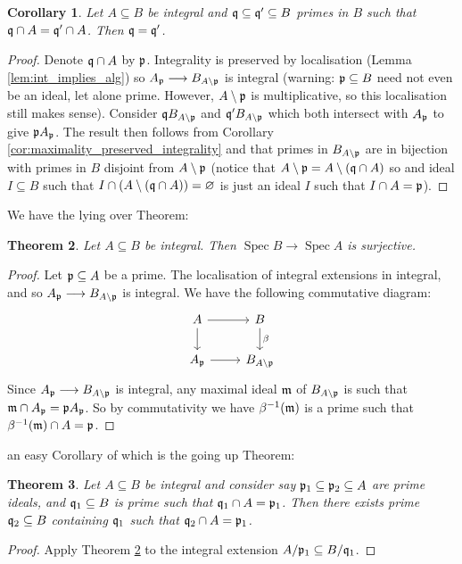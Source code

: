 \documentclass[12pt]{article}
\theoremstyle{plain}
\newtheorem{thm}{Theorem}[subsection] %
\newtheorem{cor}[thm]{Corollary}
\theoremstyle{definition}
\newcommand{\lto}{\longrightarrow}
\begin{document}
\begin{cor}
Let $A \subseteq B$ be integral and $\frak{q}\subseteq \frak{q}' \subseteq B$ primes in $B$ such that $\frak{q} \cap A = \frak{q}' \cap A$. Then $\frak{q} = \frak{q}'$.
\end{cor}
\begin{proof}
Denote $\frak{q} \cap A$ by $\frak{p}$. Integrality is preserved by localisation (Lemma \ref{lem:int_implies_alg}) so $A_\frak{p} \lto B_{A\setminus\frak{p}}$ is integral (warning: $\frak{p} \subseteq B$ need not even be an ideal, let alone prime. However, $A\setminus \frak{p}$ is multiplicative, so this localisation still makes sense). Consider $\frak{q}B_{A\setminus\frak{p}}$ and $\frak{q}'B_{A\setminus\frak{p}}$ which both intersect with $A_\frak{p}$ to give $\frak{p}A_\frak{p}$. The result then follows from Corollary \ref{cor:maximality_preserved_integrality} and that primes in $B_{A\setminus\frak{p}}$ are in bijection with primes in $B$ disjoint from ${A\setminus\frak{p}}$ (notice that $A\setminus \frak{p} = A\setminus (\frak{q} \cap A)$ so and ideal $I \subseteq B$ such that $I \cap (A\setminus(\frak{q} \cap A)) = \varnothing$ is just an ideal $I$ such that $I \cap A = \frak{p}$).
\end{proof}
We have the lying over Theorem:
\begin{thm}
\label{thm:lying_over}
Let $A \subseteq B$ be integral. Then $\operatorname{Spec}B \lto \operatorname{Spec}A$ is surjective.
\end{thm}
\begin{proof}
Let $\frak{p} \subseteq A$ be a prime. The localisation of integral extensions in integral, and so $A_\frak{p} \lto B_{A\setminus\frak{p}}$ is integral. We have the following commutative diagram:
\[
\begin{tikzcd}
A\arrow[r]\arrow[d] & B\arrow[d,"{\beta}"]\\
A_\frak{p}\arrow[r] & B_{A\setminus\frak{p}}
\end{tikzcd}
\]
Since $A_\frak{p} \lto B_{A\setminus\frak{p}}$ is integral, any maximal ideal $\frak{m}$ of $B_{A\setminus\frak{p}}$ is such that $\frak{m} \cap A_\frak{p} = \frak{p}A_\frak{p}$. So by commutativity we have $\beta^{-1}(\frak{m})$ is a prime such that $\beta^{-1}(\frak{m}) \cap A = \frak{p}$.
\end{proof}
an easy Corollary of which is the going up Theorem:
\begin{thm}
Let $A \subseteq B$ be integral and consider say $\frak{p}_1 \subseteq \frak{p}_2 \subseteq A$ are prime ideals, and $\frak{q}_1 \subseteq B$ is prime such that $\frak{q}_1 \cap A = \frak{p}_1$. Then there exists prime $\frak{q}_2 \subseteq B$ containing $\frak{q}_1$ such that $\frak{q}_2 \cap A = \frak{p}_1$.
\end{thm}
\begin{proof}
Apply Theorem \ref{thm:lying_over} to the integral extension $A/\frak{p}_1 \subseteq B/\frak{q}_1$.
\end{proof}
\end{document}
